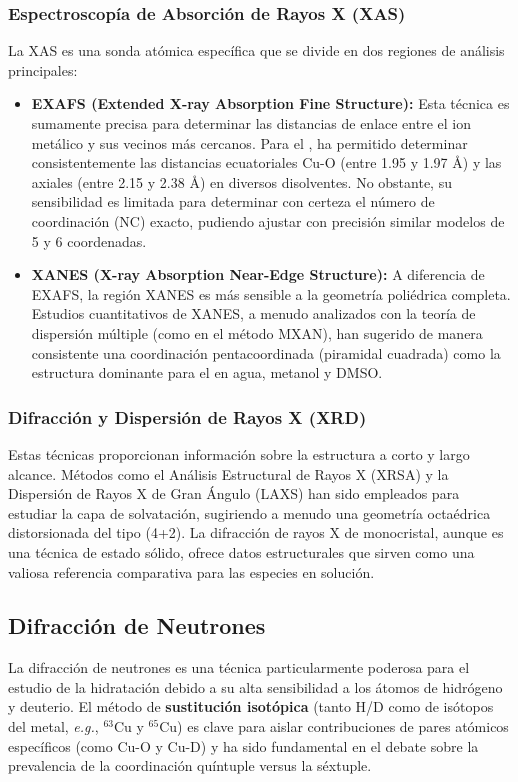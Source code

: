 \subsubsection{Espectroscopía de Absorción de Rayos X (XAS)}
La XAS es una sonda atómica específica que se divide en dos regiones de análisis principales:
\begin{itemize}
    \item \textbf{EXAFS (Extended X-ray Absorption Fine Structure):} Esta técnica es sumamente precisa para determinar las distancias de enlace entre el ion metálico y sus vecinos más cercanos. Para el , ha permitido determinar consistentemente las distancias ecuatoriales Cu-O (entre 1.95 y 1.97 Å) y las axiales (entre 2.15 y 2.38 Å) en diversos disolventes. No obstante, su sensibilidad es limitada para determinar con certeza el número de coordinación (NC) exacto, pudiendo ajustar con precisión similar modelos de 5 y 6 coordenadas.
    \item \textbf{XANES (X-ray Absorption Near-Edge Structure):} A diferencia de EXAFS, la región XANES es más sensible a la geometría poliédrica completa. Estudios cuantitativos de XANES, a menudo analizados con la teoría de dispersión múltiple (como en el método MXAN), han sugerido de manera consistente una coordinación pentacoordinada (piramidal cuadrada) como la estructura dominante para el  en agua, metanol y DMSO.
\end{itemize}

\subsubsection{Difracción y Dispersión de Rayos X (XRD)}
Estas técnicas proporcionan información sobre la estructura a corto y largo alcance. Métodos como el Análisis Estructural de Rayos X (XRSA) y la Dispersión de Rayos X de Gran Ángulo (LAXS) han sido empleados para estudiar la capa de solvatación, sugiriendo a menudo una geometría octaédrica distorsionada del tipo (4+2). La difracción de rayos X de monocristal, aunque es una técnica de estado sólido, ofrece datos estructurales que sirven como una valiosa referencia comparativa para las especies en solución.

\subsection{Difracción de Neutrones}

La difracción de neutrones es una técnica particularmente poderosa para el estudio de la hidratación debido a su alta sensibilidad a los átomos de hidrógeno y deuterio. El método de \textbf{sustitución isotópica} (tanto H/D como de isótopos del metal, \textit{e.g.}, $^{63}\text{Cu}$ y $^{65}\text{Cu}$) es clave para aislar contribuciones de pares atómicos específicos (como Cu-O y Cu-D) y ha sido fundamental en el debate sobre la prevalencia de la coordinación quíntuple versus la séxtuple.

